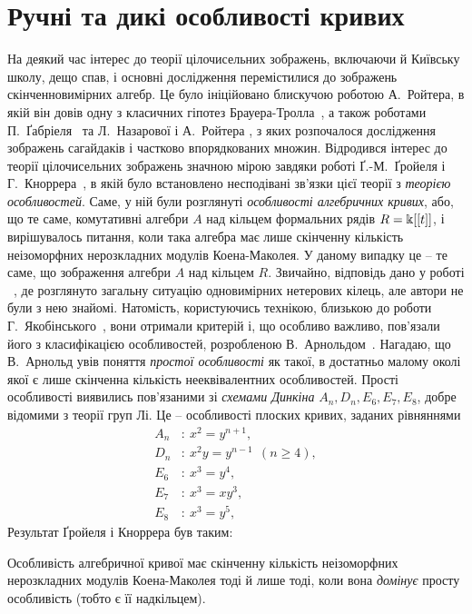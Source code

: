 \section{Ручні та дикі особливості кривих}
На деякий час інтерес до теорії цілочисельних зображень, включаючи й Київську школу, дещо спав, і основні дослідження перемістилися до зображень скінченновимірних алгебр. 
Це було ініційовано блискучою роботою А.~Ройтера, в якій він довів одну з класичних гіпотез Брауера-Тролла~\cite{Roiter-Br}, а також роботами П.~Ґабріеля~\cite{quiver} та Л.~Назарової і А.~Ройтера \cite{posets}, з яких розпочалося дослідження зображень сагайдаків і частково впорядкованих множин. 
Відродився інтерес до теорії цілочисельних зображень значною мірою завдяки роботі {Ґ.-М.~Ґройеля} і Г.~Кноррера~\cite{Gr-Kn}, в якій було встановлено несподівані зв'язки цієї теорії з \emph{теорією особливостей}. 
Саме, у ній були розглянуті \emph{особливості алгебричних кривих}, або, що те саме, комутативні алгебри $A$ над кільцем формальних рядів $R=\Bbbk[[t]]$, і вирішувалось питання, коли така алгебра має лише скінченну кількість неізоморфних нерозкладних модулів Коена-Маколея. У даному випадку це -- те саме, що зображення алгебри $A$ над кільцем $R$. 
Звичайно, відповідь дано у роботі ~\cite{DR}, де розглянуто загальну ситуацію одновимірних нетерових кілець, але автори не були з нею знайомі. 
Натомість, користуючись технікою, близькою до роботи Г.~Якобінського~\cite{Jac-fin}, вони отримали критерій і, що особливо важливо, пов'язали його з класифікацією особливостей, розробленою В.~Арнольдом~\cite{Arn-critical}. 
Нагадаю, що В.~Арнольд увів поняття \emph{простої особливості} як такої, в достатньо малому околі якої є лише скінченна кількість нееквівалентних особливостей. Прості особливості виявились пов'язаними зі \emph{схемами Динкіна} $A_n,D_n,E_6,E_7,E_8$, добре відомими з теорії груп Лі. Це -- особливості плоских кривих, заданих рівняннями
\begin{align*}
A_n&  : \ x^2=y^{n+1},\\
D_n&  : \ x^2y=y^{n-1}\ \ (n\ge4),\\
E_6&  : \ x^3=y^4,\\
E_7&  : \ x^3=xy^3,\\
E_8&  : \ x^3=y^5,
\end{align*}
Результат Ґройеля і Кноррера був таким:
\begin{theorem}
Особливість алгебричної кривої має скінченну кількість неізоморфних нерозкладних модулів Коена-Маколея  тоді й лише тоді, коли вона \emph{домінує} просту особливість (тобто є її надкільцем).
\end{theorem}

